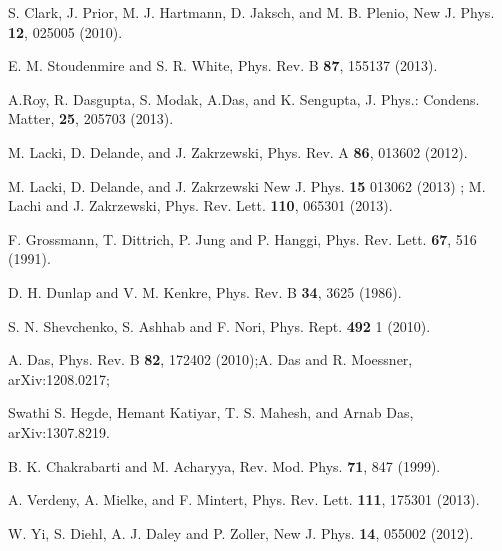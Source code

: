 \documentclass[a4paper,9pt]{article}
\renewenvironment{thebibliography}[1]{%
    \begin{oldthebibliography}{#1}%
      \setlength{\parskip}{0ex}%
      \setlength{\itemsep}{0ex}%
  }%
  {%
    \end{oldthebibliography}%
  }
\begin{document}
\begin{thebibliography}{}
S. Clark, J. Prior, M. J. Hartmann, D. Jaksch, and M. B. Plenio, New J. Phys. {\bf 12}, 025005 (2010).

E. M. Stoudenmire and S. R. White, Phys. Rev. B {\bf 87}, 155137 (2013).

A.Roy, R. Dasgupta, S. Modak, A.Das, and K. Sengupta,  J. Phys.: Condens. Matter, {\bf 25}, 205703 (2013).

M. Lacki, D. Delande, and J. Zakrzewski, Phys. Rev. A {\bf 86}, 013602 (2012).

M. Lacki, D. Delande, and J. Zakrzewski New J. Phys. {\bf 15} 013062 (2013) ; M. Lachi and J. Zakrzewski, Phys. Rev. Lett. {\bf 110}, 065301 (2013).


F. Grossmann, T. Dittrich, P. Jung and P. Hanggi, Phys. Rev. Lett. {\bf 67}, 516 (1991).


D. H. Dunlap and V. M. Kenkre, Phys. Rev. B {\bf 34}, 3625 (1986).



S. N. Shevchenko, S. Ashhab and F. Nori,
Phys. Rept. {\bf 492} 1 (2010). 

A. Das, Phys. Rev. B {\bf 82}, 172402 (2010);A. Das and R. Moessner, arXiv:1208.0217;

Swathi S. Hegde, Hemant Katiyar, T. S. Mahesh, and Arnab Das, arXiv:1307.8219.

B. K. Chakrabarti and M. Acharyya, Rev. Mod. Phys. {\bf 71}, 847 (1999).

A. Verdeny, A. Mielke, and F. Mintert, Phys. Rev. Lett. {\bf 111}, 175301 (2013).

W. Yi, S. Diehl, A. J. Daley and P. Zoller, New J. Phys. {\bf 14}, 055002 (2012).

\end{thebibliography}
\end{document}
